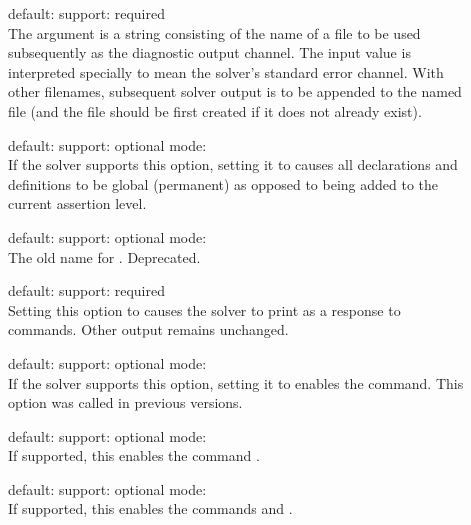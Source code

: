 \begin{description}

\item[] 
\quad default: 
\quad support: required
\\
The argument is a string consisting of the name of a file to be used subsequently 
as the diagnostic output channel.
The input value  is interpreted specially to mean 
the solver's standard error channel.  
With other filenames, subsequent solver output is to be appended to the named file 
(and the file should be first created if it does not  already exist).

\item[] 
\quad default: 
\quad support: optional
\quad mode: 
\\
If the solver supports this option, setting it to  causes all
declarations and definitions to be global (permanent) as opposed to being added
to the current assertion level.

\item[] 
\quad default: 
\quad support: optional
\quad mode: 
\\
The old name for . 
Deprecated.

\item[] 
\quad default: 
\quad support: required
\\
Setting this option to  causes the solver to print 
 as a response to commands.  
Other output remains unchanged.

\item[] 
\quad default: 
\quad support: optional
\quad mode: 
\\
If the solver supports this option, setting it to  enables 
the  command.
This option was called  in previous versions.

\item[] 
\quad default: 
\quad support: optional
\quad mode: 
\\
If supported, this enables the command .  

\item[] 
\quad default: 
\quad support: optional
\quad mode: 
\\
If supported, this enables the commands  and .  


\end{description}
